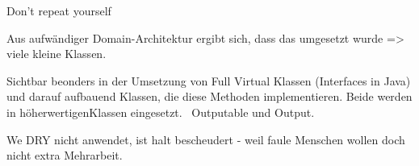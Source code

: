 
Don't repeat yourself

Aus aufwändiger Domain-Architektur ergibt sich, dass das umgesetzt wurde => viele kleine Klassen.



Sichtbar beonders in der Umsetzung von Full Virtual Klassen (Interfaces in Java) und darauf aufbauend Klassen, die diese Methoden implementieren.
Beide werden in \glq höherwertigen\grqq Klassen eingesetzt. \zB\ Outputable und Output.



We DRY nicht anwendet, ist halt bescheudert - weil faule Menschen wollen doch nicht extra Mehrarbeit.
